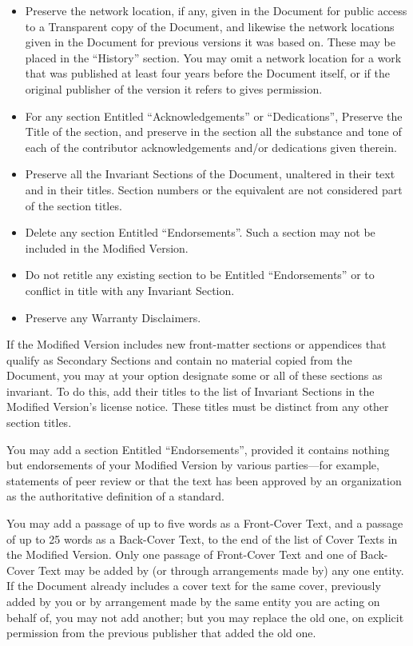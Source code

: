 \begin{itemize}
\item[J.]
   Preserve the network location, if any, given in the Document for
   public access to a Transparent copy of the Document, and likewise
   the network locations given in the Document for previous versions
   it was based on.  These may be placed in the ``History'' section.
   You may omit a network location for a work that was published at
   least four years before the Document itself, or if the original
   publisher of the version it refers to gives permission.
   
\item[K.]
   For any section Entitled ``Acknowledgements'' or ``Dedications'',
   Preserve the Title of the section, and preserve in the section all
   the substance and tone of each of the contributor acknowledgements
   and/or dedications given therein.
   
\item[L.]
   Preserve all the Invariant Sections of the Document,
   unaltered in their text and in their titles.  Section numbers
   or the equivalent are not considered part of the section titles.
   
\item[M.]
   Delete any section Entitled ``Endorsements''.  Such a section
   may not be included in the Modified Version.
   
\item[N.]
   Do not retitle any existing section to be Entitled ``Endorsements''
   or to conflict in title with any Invariant Section.
   
\item[O.]
   Preserve any Warranty Disclaimers.
\end{itemize}

If the Modified Version includes new front-matter sections or
appendices that qualify as Secondary Sections and contain no material
copied from the Document, you may at your option designate some or all
of these sections as invariant.  To do this, add their titles to the
list of Invariant Sections in the Modified Version's license notice.
These titles must be distinct from any other section titles.

You may add a section Entitled ``Endorsements'', provided it contains
nothing but endorsements of your Modified Version by various
parties---for example, statements of peer review or that the text has
been approved by an organization as the authoritative definition of a
standard.

You may add a passage of up to five words as a Front-Cover Text, and a
passage of up to 25 words as a Back-Cover Text, to the end of the list
of Cover Texts in the Modified Version.  Only one passage of
Front-Cover Text and one of Back-Cover Text may be added by (or
through arrangements made by) any one entity.  If the Document already
includes a cover text for the same cover, previously added by you or
by arrangement made by the same entity you are acting on behalf of,
you may not add another; but you may replace the old one, on explicit
permission from the previous publisher that added the old one.

